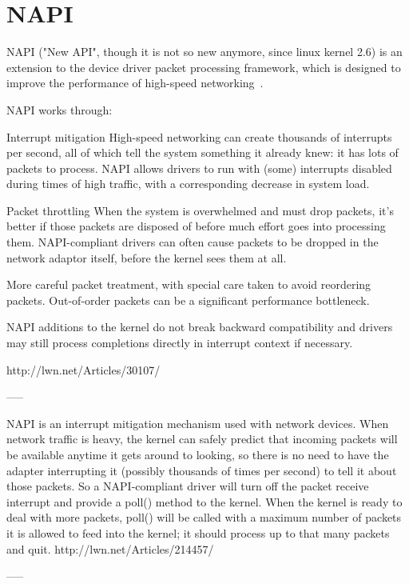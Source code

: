 
\chapter{NAPI}
NAPI ("New API", though it is not so new anymore, since linux kernel 2.6) is an extension to the device driver packet processing framework, which is designed to improve the performance of high-speed networking~\cite{linux-foundation-napi}.

NAPI works through:

Interrupt mitigation 
    High-speed networking can create thousands of interrupts per second, all of which tell the system something it already knew: it has lots of packets to process. NAPI allows drivers to run with (some) interrupts disabled during times of high traffic, with a corresponding decrease in system load.

Packet throttling 
    When the system is overwhelmed and must drop packets, it's better if those packets are disposed of before much effort goes into processing them. NAPI-compliant drivers can often cause packets to be dropped in the network adaptor itself, before the kernel sees them at all.

More careful packet treatment, with special care taken to avoid reordering packets. Out-of-order packets can be a significant performance bottleneck. 


NAPI additions to the kernel do not break backward compatibility and drivers may still process completions directly in interrupt context if necessary.

http://lwn.net/Articles/30107/

-----


NAPI is an interrupt mitigation mechanism used with network devices. When network traffic is heavy, the kernel can safely predict that incoming packets will be available anytime it gets around to looking, so there is no need to have the adapter interrupting it (possibly thousands of times per second) to tell it about those packets. So a NAPI-compliant driver will turn off the packet receive interrupt and provide a poll() method to the kernel. When the kernel is ready to deal with more packets, poll() will be called with a maximum number of packets it is allowed to feed into the kernel; it should process up to that many packets and quit.
http://lwn.net/Articles/214457/

-----

